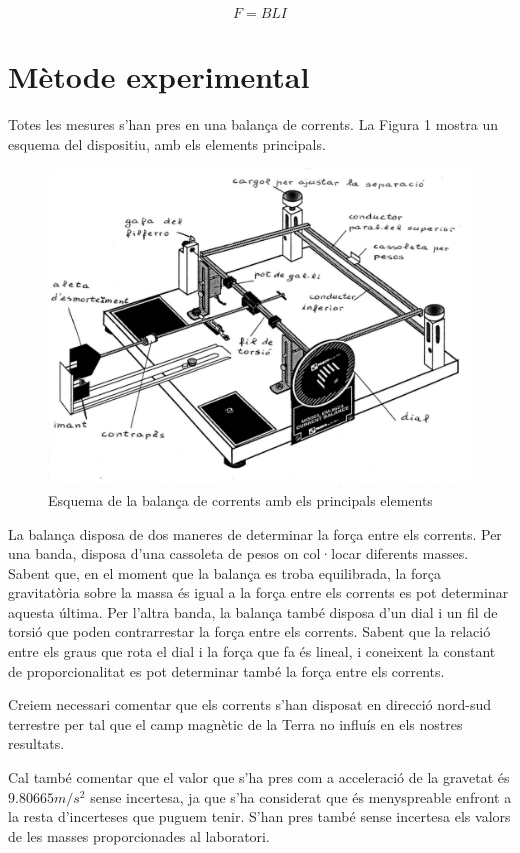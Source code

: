 \documentclass[a4paper,11pt]{article}
\begin{document}
\begin{equation}
	F=BLI
\end{equation}

\section{Mètode experimental}
Totes les mesures s'han pres en una balança de corrents. La Figura 1 mostra un esquema del dispositiu, amb els elements principals.
\begin{figure}
	\centering
	\includegraphics[scale=0.5]{Fig1.png}
	\caption{Esquema de la balança de corrents amb els principals elements}
\end{figure}

La balança disposa de dos maneres de determinar la força entre els corrents. Per una banda, disposa d'una cassoleta de pesos on col·locar diferents masses. Sabent que, en el moment que la balança es troba equilibrada, la força gravitatòria sobre la massa és igual a la força entre els corrents es pot determinar aquesta última. Per l'altra banda, la balança també disposa d'un dial i un fil de torsió que poden contrarrestar la força entre els corrents. Sabent que la relació entre els graus que rota el dial i la força que fa és lineal, i coneixent la constant de proporcionalitat es pot determinar també la força entre els corrents.

Creiem necessari comentar que els corrents s'han disposat en direcció nord-sud terrestre per tal que el camp magnètic de la Terra no influís en els nostres resultats.

Cal també comentar que el valor que s'ha pres com a acceleració de la gravetat és $9.80665 \si{m/s^2}$ sense incertesa, ja que s'ha considerat que és menyspreable enfront a la resta d'incerteses que puguem tenir. S'han pres també sense incertesa els valors de les masses proporcionades al laboratori.
\end{document}
